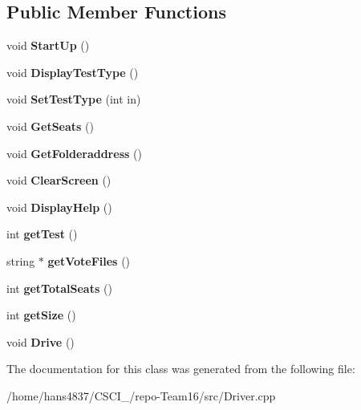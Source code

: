\subsection*{Public Member Functions}
\begin{DoxyCompactItemize}
\item 
\mbox{\label{classDriver_a2208d65a809256e174bc0511947d19a5}} 
void {\bfseries Start\+Up} ()
\item 
\mbox{\label{classDriver_afa66a3ba1778ac080ad30b07f7915daa}} 
void {\bfseries Display\+Test\+Type} ()
\item 
\mbox{\label{classDriver_a9110b66fd8fc786047317a5a653c0768}} 
void {\bfseries Set\+Test\+Type} (int in)
\item 
\mbox{\label{classDriver_acd02a66f92781df2b4c3dad62dad506b}} 
void {\bfseries Get\+Seats} ()
\item 
\mbox{\label{classDriver_a2cd4795b0b07b4018f7c0d4c5d274fa5}} 
void {\bfseries Get\+Folderaddress} ()
\item 
\mbox{\label{classDriver_a8207a3147c427f6f5ac04988ad2062ea}} 
void {\bfseries Clear\+Screen} ()
\item 
\mbox{\label{classDriver_ab663de97e197b1f6842a007a31896677}} 
void {\bfseries Display\+Help} ()
\item 
\mbox{\label{classDriver_a3f4eae6573765b012d98351df5e5bc5a}} 
int {\bfseries get\+Test} ()
\item 
\mbox{\label{classDriver_a313df2bcb750e2d91bfbe61dfdf32df7}} 
string $\ast$ {\bfseries get\+Vote\+Files} ()
\item 
\mbox{\label{classDriver_a0bb8bda66543ae9a662723dfb0a5eca6}} 
int {\bfseries get\+Total\+Seats} ()
\item 
\mbox{\label{classDriver_aa3cac88980b5d7c292d1c795086495a8}} 
int {\bfseries get\+Size} ()
\item 
\mbox{\label{classDriver_a742a16dbeddf4940c05cc2c6c59dd32f}} 
void {\bfseries Drive} ()
\end{DoxyCompactItemize}


The documentation for this class was generated from the following file\+:\begin{DoxyCompactItemize}
\item 
/home/hans4837/\+C\+S\+C\+I\+\_/repo-\/\+Team16/src/Driver.\+cpp\end{DoxyCompactItemize}
